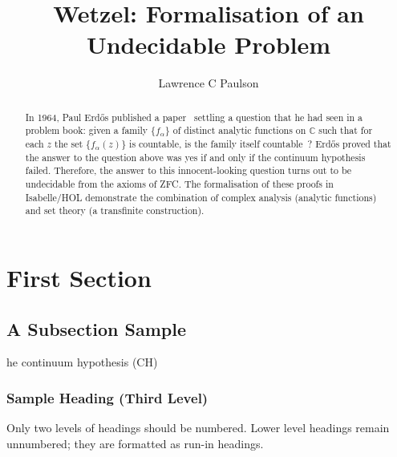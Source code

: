\documentclass[runningheads]{llncs}
\begin{document}
%
\title{Wetzel: Formalisation of an Undecidable Problem}
%
%
\author{Lawrence C Paulson}
%
%
%
\maketitle              %
%
\begin{abstract}
In 1964, Paul Erd\H{o}s published a paper~\cite{erdos-interpolation} settling a question that he had seen in a problem book: given a family $\{f_\alpha\}$ of distinct analytic functions on $\mathbb{C}$ such that for each $z$ the set  $\{f_\alpha ( z )\}$ is countable, is the family itself countable~\cite{garcia-wetzels-problem}?
Erd\H{o}s proved that the answer to the question above was yes if and only if the continuum hypothesis failed.
Therefore, the answer to this innocent-looking question turns out to be undecidable from the axioms of ZFC\@.
The formalisation of these proofs in Isabelle/HOL demonstrate the combination of complex analysis (analytic functions) and set theory (a transfinite construction).
\end{abstract}
%
%
%
\section{First Section}
\subsection{A Subsection Sample}




he continuum hypothesis (CH)


\subsubsection{Sample Heading (Third Level)} Only two levels of
headings should be numbered. Lower level headings remain unnumbered;
they are formatted as run-in headings.
\end{document}
